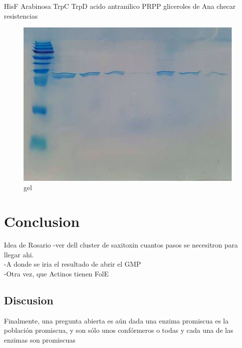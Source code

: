 \documentclass[12pt,twoside]{reedthesis}
\begin{document}
  HisF Arabinosa TrpC TrpD acido antranilico PRPP gliceroles de Ana checar
  resistencias
  
  \begin{figure}[h!tbp]
  \centering
  \includegraphics[angle = 0,scale = 0.6]{chapter4/Geles/PriAAbril30.png}
  \caption[gel]{\normalsize{gel}}
  \label{fig:gel}
  \end{figure}
  
  \begin{Shaded}
  \begin{Highlighting}[]
  \end{Highlighting}
  \end{Shaded}
  
  \chapter*{Conclusion}\label{conclusion}
  
  \setcounter{chapter}{4} \setcounter{section}{0}
  
  Idea de Rosario -ver dell cluster de saxitoxin cuantos pasos se
  necesitron para llegar ahi.\\
  -A donde se iria el resultado de abrir el GMP\\
  -Otra vez, que Actinos tienen FolE
  
  \section{Discusion}\label{discusion}
  
  Finalmente, una pregunta abierta es aún dada una enzima promiscua es la
  población promiscua, y son sólo unos confórmeros o todas y cada una de
  las enzimas son promiscuas
  
\end{document}
